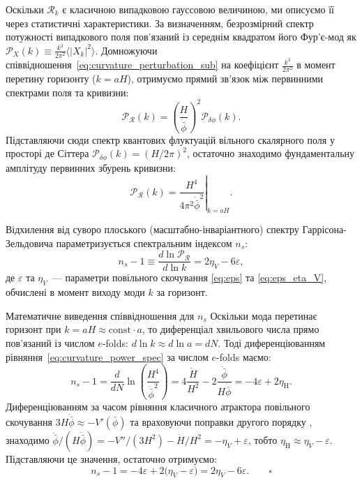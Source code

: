 Оскільки $\mathcal{R}_k$ є класичною випадковою гауссовою величиною, ми описуємо її через статистичні характеристики. За визначенням, безрозмірний спектр потужності випадкового поля пов'язаний із середнім квадратом його Фур'є-мод як $\mathcal{P}_X(k) \equiv \frac{k^3}{2\pi^2} \langle |X_k|^2 \rangle$. Домножуючи співвідношення~\eqref{eq:curvature_perturbation_sub} на коефіцієнт $\frac{k^3}{2\pi^2}$ в момент перетину горизонту ($k = aH$), отримуємо прямий зв'язок між первинними спектрами поля та кривизни:
\begin{equation}\label{eq:spec_relation}
  \mathcal{P}_{\mathcal{R}}(k) = \left(\frac{H}{\dot{\bar{\phi}}}\right)^{\!2} \mathcal{P}_{\delta\phi}(k).
\end{equation}
Підставляючи сюди спектр квантових флуктуацій вільного скалярного поля у просторі де Сіттера $\mathcal{P}_{\delta\phi}(k) = (H/2\pi)^2$, остаточно знаходимо фундаментальну амплітуду первинних збурень кривизни:
\begin{equation}\label{eq:curvature_power_spec}
  \mathcal{P}_{\mathcal{R}}(k) = \left. \frac{H^4}{4\pi^2\dot{\bar{\phi}}^2} \right|_{k=aH}.
\end{equation}

Відхилення від суворо плоського (масштабно-інваріантного) спектру Гар\-рі\-со\-на-Зельдовича параметризується спектральним індексом $n_s$:
\begin{equation}\label{eq:ns}
  n_s - 1 \equiv \frac{d\ln\mathcal{P}_{\mathcal{R}}}{d\ln k} = 2\eta_V - 6\varepsilon,
\end{equation}
де $\varepsilon$ та $\eta_V$~--- параметри повільного скочування \eqref{eq:eps} та \eqref{eq:eps_eta_V}, обчислені в момент виходу моди $k$ за горизонт.

\begin{keybox}{Математичне виведення співвідношення для $n_s$}
Оскільки мода перетинає горизонт при $k = aH \approx \mathrm{const} \cdot a$, то диференціал хвильового числа прямо пов'язаний із числом $e$-folds: $d\ln k \approx d\ln a = dN$. Тоді диференціюванням рівняння~\eqref{eq:curvature_power_spec} за числом $e$-folds маємо:
\begin{equation*}
  n_s - 1 = \frac{d}{dN}\ln\! \left(\frac{H^4}{\dot{\bar\phi}^2}\right) = 4\frac{\dot H}{H^2} - 2\frac{\ddot{\bar\phi}}{H\dot{\bar\phi}} = -4\varepsilon + 2\eta_\mathrm{H}.
\end{equation*}
Диференціюванням за часом рівняння класичного атрактора повільного скочування $3H\dot{\bar\phi} \approx -V'(\bar\phi)$ та враховуючи поправки другого порядку \cite{mukhanov_2005}, знаходимо $\ddot{\bar\phi}/(H\dot{\bar\phi}) = -V''/(3H^2) - \dot H/H^2 = -\eta_V + \varepsilon$, тобто $\eta_\mathrm{H} \approx \eta_V - \varepsilon$. Підставляючи це значення, остаточно отримуємо:
\begin{equation*}
  n_s - 1 = -4\varepsilon + 2\bigl(\eta_V - \varepsilon\bigr) = 2\eta_V - 6\varepsilon. \qquad\square
\end{equation*}
\end{keybox}

